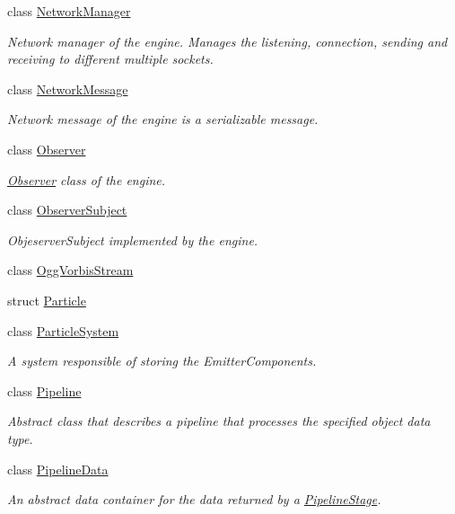 \begin{DoxyCompactItemize}
\item 
class \hyperlink{class_blade_1_1_network_manager}{Network\+Manager}
\begin{DoxyCompactList}\small\item\em Network manager of the engine. Manages the listening, connection, sending and receiving to different multiple sockets. \end{DoxyCompactList}\item 
class \hyperlink{class_blade_1_1_network_message}{Network\+Message}
\begin{DoxyCompactList}\small\item\em Network message of the engine is a serializable message. \end{DoxyCompactList}\item 
class \hyperlink{class_blade_1_1_observer}{Observer}
\begin{DoxyCompactList}\small\item\em \hyperlink{class_blade_1_1_observer}{Observer} class of the engine. \end{DoxyCompactList}\item 
class \hyperlink{class_blade_1_1_observer_subject}{Observer\+Subject}
\begin{DoxyCompactList}\small\item\em Objeserver\+Subject implemented by the engine. \end{DoxyCompactList}\item 
class \hyperlink{class_blade_1_1_ogg_vorbis_stream}{Ogg\+Vorbis\+Stream}
\item 
struct \hyperlink{struct_blade_1_1_particle}{Particle}
\item 
class \hyperlink{class_blade_1_1_particle_system}{Particle\+System}
\begin{DoxyCompactList}\small\item\em A system responsible of storing the Emitter\+Components. \end{DoxyCompactList}\item 
class \hyperlink{class_blade_1_1_pipeline}{Pipeline}
\begin{DoxyCompactList}\small\item\em Abstract class that describes a pipeline that processes the specified object data type. \end{DoxyCompactList}\item 
class \hyperlink{class_blade_1_1_pipeline_data}{Pipeline\+Data}
\begin{DoxyCompactList}\small\item\em An abstract data container for the data returned by a \hyperlink{class_blade_1_1_pipeline_stage}{Pipeline\+Stage}. \end{DoxyCompactList}\item 

\end{DoxyCompactItemize}
